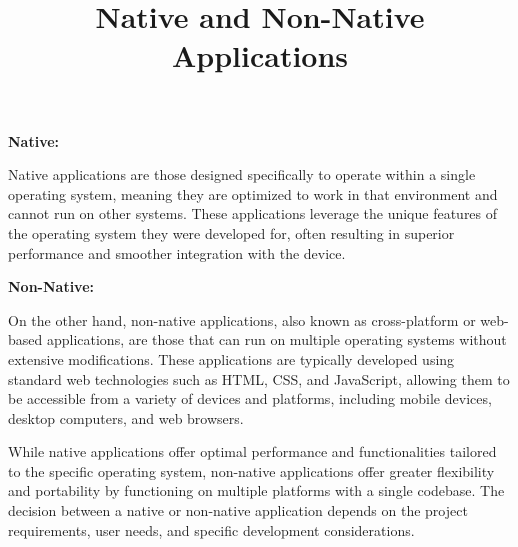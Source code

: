 \documentclass{article}
\title{Native and Non-Native Applications}
\author{}
\date{}
\begin{document}
\maketitle

\textbf{Native:}

Native applications are those designed specifically to operate within a single operating system, meaning they are optimized to work in that environment and cannot run on other systems. These applications leverage the unique features of the operating system they were developed for, often resulting in superior performance and smoother integration with the device.

\textbf{Non-Native:}

On the other hand, non-native applications, also known as cross-platform or web-based applications, are those that can run on multiple operating systems without extensive modifications. These applications are typically developed using standard web technologies such as HTML, CSS, and JavaScript, allowing them to be accessible from a variety of devices and platforms, including mobile devices, desktop computers, and web browsers.

While native applications offer optimal performance and functionalities tailored to the specific operating system, non-native applications offer greater flexibility and portability by functioning on multiple platforms with a single codebase. The decision between a native or non-native application depends on the project requirements, user needs, and specific development considerations.
\end{document}

